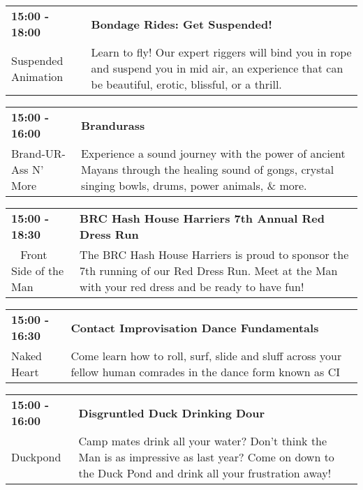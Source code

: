 \begin{tabular}{ p{1in} p{2.2in} }
    \textbf{15:00 - 18:00} & \textbf{Bondage Rides: Get Suspended!} \\
    Suspended Animation \newline  & Learn to fly! Our expert riggers will bind you in rope and suspend you in mid air, an experience that can be beautiful, erotic, blissful, or a thrill. \\
    \hline 
\end{tabular}
    
\begin{tabular}{ p{1in} p{2.2in} }
    \textbf{15:00 - 16:00} & \textbf{Brandurass} \\
    Brand-UR-Ass N' More \newline  & Experience a sound journey with the power of ancient Mayans through the healing sound of gongs, crystal singing bowls, drums, power animals, \& more. \\
    \hline 
\end{tabular}
    
\begin{tabular}{ p{1in} p{2.2in} }
    \textbf{15:00 - 18:30} & \textbf{BRC Hash House Harriers 7th Annual Red Dress Run} \\
    ~ \newline Front Side of the Man & The BRC Hash House Harriers is proud to sponsor the 7th running of our Red Dress Run. Meet at the Man with your red dress and be ready to have fun! \\
    \hline 
\end{tabular}
    
\begin{tabular}{ p{1in} p{2.2in} }
    \textbf{15:00 - 16:30} & \textbf{Contact Improvisation Dance Fundamentals} \\
    Naked Heart \newline  & Come learn how to roll, surf, slide and sluff across your fellow human comrades in the dance form known as CI \\
    \hline 
\end{tabular}
    
\begin{tabular}{ p{1in} p{2.2in} }
    \textbf{15:00 - 16:00} & \textbf{Disgruntled Duck Drinking Dour} \\
    Duckpond \newline  & Camp mates drink all your water? Don't think the Man is as impressive as last year? Come on down to the Duck Pond and drink all your frustration away! \\
    \hline 
\end{tabular}
    
